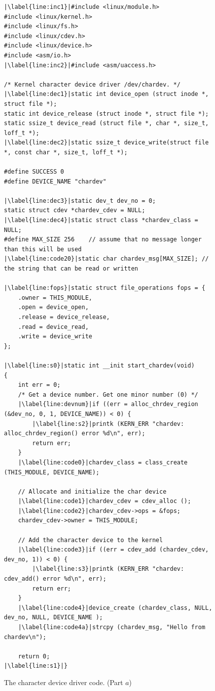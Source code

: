 \documentclass[epsfig,10pt,fullpage]{article}
\begin{document}
\lstset{language=C,numbers=left,escapechar=|}
\begin{figure}[H]
\begin{center}
\begin{minipage}[t]{15 cm}
\begin{lstlisting}[name=chardev]
|\label{line:inc1}|#include <linux/module.h>
#include <linux/kernel.h>
#include <linux/fs.h>
#include <linux/cdev.h>
#include <linux/device.h>
#include <asm/io.h>
|\label{line:inc2}|#include <asm/uaccess.h>

/* Kernel character device driver /dev/chardev. */
|\label{line:dec1}|static int device_open (struct inode *, struct file *);
static int device_release (struct inode *, struct file *);
static ssize_t device_read (struct file *, char *, size_t, loff_t *);
|\label{line:dec2}|static ssize_t device_write(struct file *, const char *, size_t, loff_t *);

#define SUCCESS 0
#define DEVICE_NAME "chardev"

|\label{line:dec3}|static dev_t dev_no = 0;
static struct cdev *chardev_cdev = NULL;
|\label{line:dec4}|static struct class *chardev_class = NULL;
#define MAX_SIZE 256	// assume that no message longer than this will be used
|\label{line:code20}|static char chardev_msg[MAX_SIZE];	// the string that can be read or written

|\label{line:fops}|static struct file_operations fops = {
	.owner = THIS_MODULE,
	.open = device_open,
	.release = device_release,
	.read = device_read,
	.write = device_write
};

|\label{line:s0}|static int __init start_chardev(void)
{
	int err = 0;
	/* Get a device number. Get one minor number (0) */
	|\label{line:devnum}|if ((err = alloc_chrdev_region (&dev_no, 0, 1, DEVICE_NAME)) < 0) {
		|\label{line:s2}|printk (KERN_ERR "chardev: alloc_chrdev_region() error %d\n", err);
		return err;
	}
	|\label{line:code0}|chardev_class = class_create (THIS_MODULE, DEVICE_NAME);
	
	// Allocate and initialize the char device
	|\label{line:code1}|chardev_cdev = cdev_alloc (); 
	|\label{line:code2}|chardev_cdev->ops = &fops; 
	chardev_cdev->owner = THIS_MODULE; 
   
	// Add the character device to the kernel
	|\label{line:code3}|if ((err = cdev_add (chardev_cdev, dev_no, 1)) < 0) {
		|\label{line:s3}|printk (KERN_ERR "chardev: cdev_add() error %d\n", err);
		return err;
	}
	|\label{line:code4}|device_create (chardev_class, NULL, dev_no, NULL, DEVICE_NAME );
	|\label{line:code4a}|strcpy (chardev_msg, "Hello from chardev\n"); 

	return 0;
|\label{line:s1}|}
\end{lstlisting}
\end{minipage}
\caption{The character device driver code. (Part $a$)}
\label{fig:chardev}
\end{center}
\end{figure}
\end{document}
